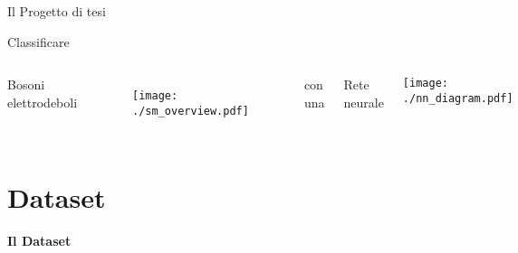 \documentclass{beamer}
\begin{document}
\begin{frame}{Il Progetto di tesi}
%
%
  \vspace*{-3.5ex}
  \begin{center}
    \Large
    Classificare
  \end{center}
  \vspace*{-1.5ex}
  \begin{columns}[T]
      \begin{block}{}
        \centering%
        Bosoni elettrodeboli
      \end{block}
      \begin{figure}
        \centering
        \texttt{[image: ./sm\_overview.pdf]}
      \end{figure}

      {
        \begin{block}{}
          \centering\small
          con una
        \end{block}
      }
      \begin{block}{}
        \centering
        Rete neurale
      \end{block}
      \parbox[t][][c]{\textwidth}{
        \vspace*{3ex}
        \centering
        \texttt{[image: ./nn\_diagram.pdf]}
      }
  \end{columns}
\end{frame}

\section{Dataset}
\begin{frame}
  \centering
  \Huge\bfseries
  Il Dataset
\end{frame}
\end{document}
